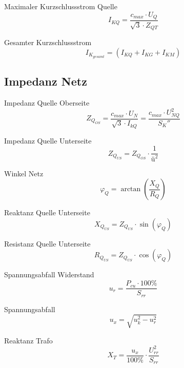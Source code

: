 \documentclass[11pt, a4paper, draft, fleqn, twocolumn]{article}
\numberwithin{equation}{subsection}
\begin{document}
\noindent Maximaler Kurzschlussstrom Quelle
\begin{equation}
    I_{KQ} = \frac{c_{max} \cdot U_Q}{\sqrt{3} \cdot Z_{QT}}
\end{equation}

\noindent Gesamter Kurzschlussstrom
\begin{equation}
    I_{K_{gesamt}} = (I_{KQ} + I_{KG} + I_{KM})
\end{equation}


\subsection{Impedanz Netz}

Impedanz Quelle Oberseite
\begin{equation}
    Z_{Q_{OS}} = \frac{c_{max} \cdot U_N}{\sqrt{3} \cdot I_{kQ}} = \frac{c_{max} \cdot U_{NQ}^2}{S_K''}
\end{equation}

\noindent Impedanz Quelle Unterseite
\begin{equation}
    Z_{Q_{US}} = Z_{Q_{OS}} \cdot \frac{1}{\text{ü}^2}
\end{equation}

\noindent Winkel Netz
\begin{equation}
    \varphi_Q = \arctan(\frac{X_Q}{R_Q})
\end{equation}

\noindent Reaktanz Quelle Unterseite
\begin{equation}
    X_{Q_{US}} = Z_{Q_{US}} \cdot \sin(\varphi_Q)
\end{equation}

\noindent Resistanz Quelle Unterseite
\begin{equation}
    R_{Q_{US}} = Z_{Q_{US}} \cdot \cos(\varphi_Q)
\end{equation}

\noindent Spannungsabfall Widerstand
\begin{equation}
    u_r = \frac{P_{cu} \cdot 100\%}{S_{rr}}
\end{equation}

\noindent Spannungsabfall
\begin{equation}
    u_x = \sqrt{u_k^2 - u_r^2}
\end{equation}

\noindent Reaktanz Trafo
\begin{equation}
    X_T = \frac{u_x}{100\%} \cdot \frac{U_{rr}^2}{S_{rr}}
\end{equation}
\end{document}
